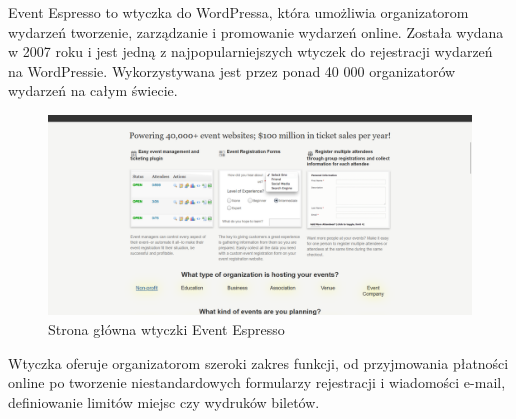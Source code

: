 Event Espresso to wtyczka do WordPressa, która umożliwia organizatorom wydarzeń tworzenie, zarządzanie i promowanie wydarzeń online. Została wydana w 2007 roku i jest jedną z najpopularniejszych wtyczek do rejestracji wydarzeń na WordPressie. Wykorzystywana jest przez ponad 40 000 organizatorów wydarzeń na całym świecie.\autocite{eventespresso}

\begin{figure}[h]
    \begin{center}
    \includegraphics[scale=0.35]{imgs/solutions/eventespresso.png}
    \end{center}
    \caption{Strona główna wtyczki Event Espresso}
    \label{rys:ee_interfejs}
    \end{figure}
Wtyczka oferuje organizatorom szeroki zakres funkcji, od przyjmowania płatności online po tworzenie niestandardowych formularzy rejestracji i wiadomości e-mail, definiowanie limitów miejsc czy wydruków biletów.